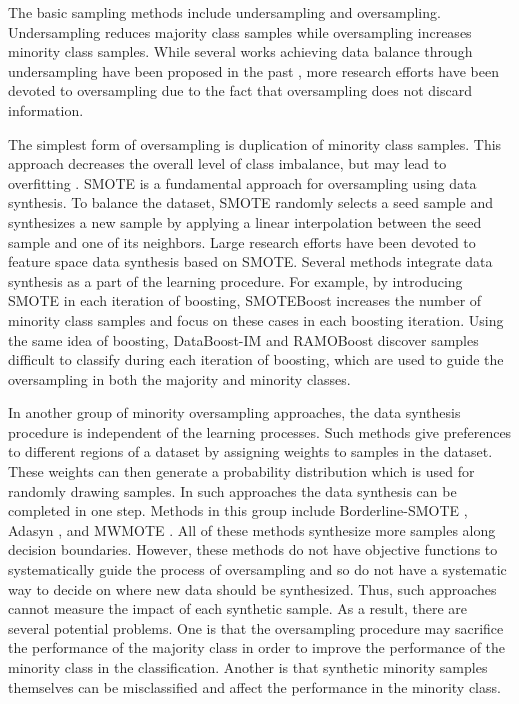 \documentclass{iitthesis}
\begin{document}
The basic sampling methods include undersampling and oversampling. Undersampling reduces majority class samples while oversampling increases minority class samples. While several works achieving data balance through undersampling have been proposed in the past \cite{liu2009exploratory}\cite{ZJMI03}, more research efforts have been devoted to oversampling due to the fact that oversampling does not discard information.

The simplest form of oversampling is duplication of minority class samples. This approach decreases the overall level of class imbalance, but may lead to overfitting \cite{Drummond03c4.5}. SMOTE \cite{CNV:02} is a fundamental approach for oversampling using data synthesis. To balance the dataset, SMOTE randomly selects a seed sample and synthesizes a new sample by applying a linear interpolation between the seed sample and one of its neighbors. Large research efforts have been devoted to feature space data synthesis based on SMOTE. Several methods integrate data synthesis as a part of the learning procedure. For example, by introducing SMOTE in each iteration of boosting, SMOTEBoost \cite{chawla2003smoteboost} increases the number of minority class samples and focus on these cases in each boosting iteration. Using the same idea of boosting, DataBoost-IM \cite{guo2004learning} and RAMOBoost \cite{chen2010ramoboost} discover samples difficult to classify during each iteration of boosting, which are used to guide the oversampling in both the majority and minority classes. 

In another group of minority oversampling approaches, the data synthesis procedure is independent of the learning processes. Such methods give preferences to different regions of a dataset by assigning weights to samples in the dataset. These weights can then generate a probability distribution which is used for  randomly drawing samples. In such approaches the data synthesis can be completed in one step. Methods in this group include Borderline-SMOTE \cite{HH:05}, Adasyn \cite{HH:08}, \cite{barua2011novel} and MWMOTE \cite{barua2014mwmote}. All of these methods synthesize more samples along decision boundaries. However, these methods do not have objective functions to systematically guide the process of oversampling and so do not have a systematic way to decide on where new data should be synthesized. Thus, such approaches cannot measure the impact of each synthetic sample. As a result, there are several potential problems. One is that the oversampling procedure may sacrifice the performance of the majority class in order to improve the performance of the minority class in the classification. Another is that synthetic minority samples themselves can be misclassified and affect the performance in the minority class.
\end{document}
